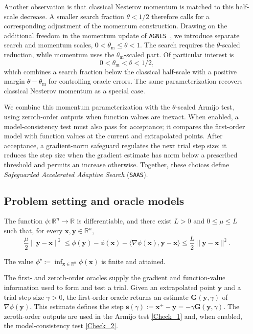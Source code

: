 \documentclass{article}
\begin{document}
Another observation is that classical Nesterov momentum is matched to this half-scale decrease. A smaller search fraction \(\theta<1/2\) therefore calls for a corresponding adjustment of the momentum construction. Drawing on the additional freedom in the momentum update of \texttt{AGNES}~\cite{gupta2024nesterovaccelerationdespitenoisy}, we introduce separate search and momentum scales, \(0<\theta_{\mathrm m}\le\theta<1\). The search requires the $\theta$-scaled reduction, while momentum uses the $\theta_{\mathrm m}$-scaled part. Of particular interest is
\[
0<\theta_{\mathrm m}<\theta<1/2,
\]
which combines a search fraction below the classical half-scale with a positive margin $\theta\!-\!\theta_{\mathrm m}$ for controlling oracle errors. The same parameterization recovers classical Nesterov momentum as a special case.

We combine this momentum parameterization with the
\(\theta\)-scaled Armijo test, using zeroth-order outputs when
function values are inexact. When enabled, a model-consistency test must also pass for acceptance;
it compares the first-order model with function values at the current
and extrapolated points.
After acceptance, a gradient-norm safeguard regulates the next trial step size: it reduces the step size when the gradient estimate has norm below a prescribed threshold and permits an increase otherwise. Together, these
choices define \emph{Safeguarded Accelerated Adaptive Search}
(\texttt{SAAS}). 

\subsection{Problem setting and oracle models}
\label{subsec:prob_set}

\begin{assumption}
\label{assump:SC-Lsmooth}
The function \(\phi\colon \mathbb R^n\to\mathbb R\) is differentiable, and
there exist \(L>0\) and \(0\le\mu\le L\) such that, for every
\(\bm{x},\bm{y}\in\mathbb R^n\),
\begin{equation}\label{eq:SC-Lsmooth}
\frac{\mu}{2}\|\bm{y}-\bm{x}\|^2
\le
\phi(\bm{y})-\phi(\bm{x})-\langle\nabla\phi(\bm{x}),\bm{y}-\bm{x}\rangle
\le
\frac{L}{2}\|\bm{y}-\bm{x}\|^2.
\end{equation}
\end{assumption}

\begin{assumption}
\label{assump:global-min}
The value
\(\phi^\star\coloneqq \inf_{\bm{x}\in\mathbb R^n}\phi(\bm{x})\) is finite and attained.
\end{assumption}
The first- and zeroth-order oracles supply the gradient and function-value information used to form and test a trial. Given an extrapolated point $\bm{y}$ and a trial step size $\gamma>0$, the first-order oracle returns an estimate $\mathbf{G}(\bm{y},\gamma)$ of $\nabla\phi(\bm{y})$. This estimate defines the step $\bm{s}(\gamma):=\bm{x}^+-\bm{y}=-\gamma\mathbf{G}(\bm{y},\gamma)$. The zeroth-order outputs are used in the Armijo test \eqref{Check_1} and, when enabled, the model-consistency test \eqref{Check_2}.
\end{document}
